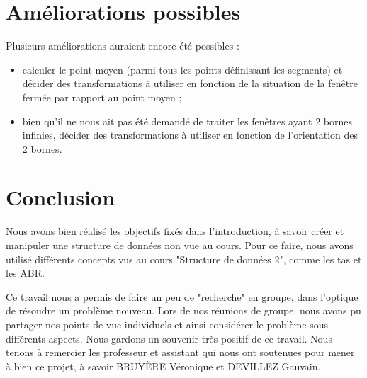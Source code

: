 \documentclass[10pt,a4paper]{article}
\begin{document}
\section{Améliorations possibles}
Plusieurs améliorations auraient encore été possibles :
\begin{itemize}
	\item calculer le point moyen (parmi tous les points définissant les segments) et décider des transformations à utiliser en fonction de la situation de la fenêtre fermée par rapport au point moyen ;
	\item bien qu'il ne nous ait pas été demandé de traiter les fenêtres ayant 2 bornes infinies, décider des transformations à utiliser en fonction de l'orientation des 2 bornes.
\end{itemize}

\newpage

\section{Conclusion}
Nous avons bien réalisé les objectifs fixés dans l'introduction, à savoir créer et manipuler une structure de données non vue au cours. Pour ce faire, nous avons utilisé différents concepts vus au cours "Structure de données 2", comme les tas et les ABR.

Ce travail nous a permis de faire un peu de "recherche" en groupe, dans l'optique de résoudre un problème nouveau. Lors de nos réunions de groupe, nous avons pu partager nos points de vue individuels et ainsi considérer le problème sous différents aspects. Nous gardons un souvenir très positif de ce travail. Nous tenons à remercier les professeur et assistant qui nous ont soutenues pour mener à bien ce projet, à savoir BRUYÈRE Véronique et DEVILLEZ Gauvain.
\end{document}
